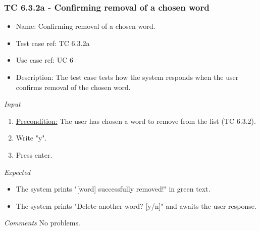 \documentclass[12pt, letterpaper]{article}
\begin{document}
\subsubsection{TC 6.3.2a - Confirming removal of a chosen word}
\begin{itemize}
	\item Name: Confirming removal of a chosen word.
	\item Test case ref: TC 6.3.2a
	\item Use case ref: UC 6
	\item Description: The test case tests how the system responds when the user confirms removal of the chosen word.
\end{itemize}
\emph{Input}
\begin{enumerate}
	\item \underline{Precondition:} The user has chosen a word to remove from the list (TC 6.3.2).
	\item Write "y".
	\item Press enter.
\end{enumerate}
\emph{Expected}
\begin{itemize}
	\item The system prints "[word] successfully removed!" in green text.
	\item The system prints "Delete another word? [y/n]" and awaits the user response.
\end{itemize}
\begin{Form}
	\newline
	\newline
\end{Form}
\newline
\emph{Comments}
No problems.
\end{document}
